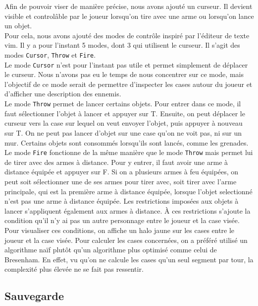 \documentclass[10pt,a4paper]{article}
\begin{document}
Afin de pouvoir viser de manière précise, nous avons ajouté un curseur. Il devient visible et control\^able par le joueur lorsqu'on tire avec une arme ou lorsqu'on lance un objet.\\
Pour cela, nous avons ajouté des modes de contr\^ole inspiré par l'éditeur de texte vim. Il y a pour l'instant 5 modes, dont 3 qui utilisent le curseur. Il s'agit des modes \texttt{Cursor}, \texttt{Throw} et \texttt{Fire}.\\
Le mode \texttt{Cursor} n'est pour l'instant pas utile et permet simplement de déplacer le curseur. Nous n'avons pas eu le temps de nous concentrer sur ce mode, mais l'objectif de ce mode serait de permettre d'inspecter les cases autour du joueur et d'afficher une description des ennemis.\\
Le mode \texttt{Throw} permet de lancer certains objets. Pour entrer dans ce mode, il faut sélectionner l'objet à lancer et appuyer sur T. Ensuite, on peut déplacer le curseur vers la case sur lequel on veut envoyer l'objet, puis appuyer à nouveau sur T. On ne peut pas lancer d'objet sur une case qu'on ne voit pas, ni sur un mur. Certains objets sont consommés lorsqu'ils sont lancés, comme les grenades.\\
Le mode \texttt{Fire} fonctionne de la même manière que le mode \texttt{Throw} mais permet lui de tirer avec des armes à distance. Pour y entrer, il faut avoir une arme à distance équipée et appuyer sur F. Si on a plusieurs armes à feu équipées, on peut soit sélectionner une de ses armes pour tirer avec, soit tirer avec l'arme principale, qui est la première arme à distance équipée, lorsque l'objet selectionné n'est pas une arme à distance équipée. Les restrictions imposées aux objets à lancer s'appliquent également aux armes à distance. À ces restrictions s'ajoute la condition qu'il n'y ai pas un autre personnage entre le joueur et la case visée. Pour visualiser ces conditions, on affiche un halo jaune sur les cases entre le joueur et la case visée. Pour calculer les cases concernées, on a préféré utilisé un algorithme naïf plut\^ot qu'un algorithme plus optimisé comme celui de Bresenham. En effet, vu qu'on ne calcule les cases qu'un seul segment par tour, la complexité plus élevée ne se fait pas ressentir.\\

\subsection{Sauvegarde}
\end{document}
